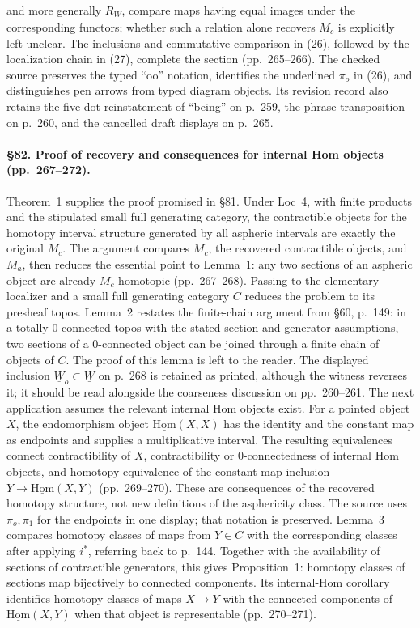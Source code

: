 and more generally $R_{\underline{W}}$, compare maps having equal images under the corresponding functors; whether such a relation alone recovers $M_c$ is explicitly left unclear. The inclusions and commutative comparison in (26), followed by the localization chain in (27), complete the section (pp.\ 265--266). The checked source preserves the typed “oo” notation, identifies the underlined $\pi_o$ in (26), and distinguishes pen arrows from typed diagram objects. Its revision record also retains the five-dot reinstatement of “being” on p.\ 259, the phrase transposition on p.\ 260, and the cancelled draft displays on p.\ 265.



\paragraph{\S82. Proof of recovery and consequences for internal Hom objects (pp.\ 267--272).}
Theorem~1 supplies the proof promised in \S81. Under Loc~4, with finite products and the stipulated small full generating category, the contractible objects for the homotopy interval structure generated by all aspheric intervals are exactly the original $M_c$. The argument compares $M_c$, the recovered contractible objects, and $M_a$, then reduces the essential point to Lemma~1: any two sections of an aspheric object are already $M_c$-homotopic (pp.\ 267--268). Passing to the elementary localizer and a small full generating category $C$ reduces the problem to its presheaf topos. Lemma~2 restates the finite-chain argument from \S60, p.\ 149: in a totally 0-connected topos with the stated section and generator assumptions, two sections of a 0-connected object can be joined through a finite chain of objects of $C$. The proof of this lemma is left to the reader. The displayed inclusion $\underline W_o\subset\underline W$ on p.\ 268 is retained as printed, although the witness reverses it; it should be read alongside the coarseness discussion on pp.\ 260--261.
The next application assumes the relevant internal Hom objects exist. For a pointed object $X$, the endomorphism object $\underline{\mathrm{Hom}}(X,X)$ has the identity and the constant map as endpoints and supplies a multiplicative interval. The resulting equivalences connect contractibility of $X$, contractibility or 0-connectedness of internal Hom objects, and homotopy equivalence of the constant-map inclusion $Y\to\underline{\mathrm{Hom}}(X,Y)$ (pp.\ 269--270). These are consequences of the recovered homotopy structure, not new definitions of the asphericity class. The source uses $\pi_o,\pi_1$ for the endpoints in one display; that notation is preserved. Lemma~3 compares homotopy classes of maps from $Y\in C$ with the corresponding classes after applying $i^*$, referring back to p.\ 144. Together with the availability of sections of contractible generators, this gives Proposition~1: homotopy classes of sections map bijectively to connected components. Its internal-Hom corollary identifies homotopy classes of maps $X\to Y$ with the connected components of $\underline{\mathrm{Hom}}(X,Y)$ when that object is representable (pp.\ 270--271).
